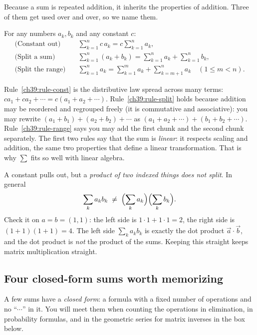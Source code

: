 Because a sum is repeated addition, it inherits the properties of addition. Three of
them get used over and over, so we name them.

\begin{formalbox}
For any numbers $a_k, b_k$ and any constant $c$:
\begin{align}
\text{(Constant out)}\quad & \sum_{k=1}^{n} c\,a_k = c\sum_{k=1}^{n} a_k, \label{ch39:rule-const}\\[2pt]
\text{(Split a sum)}\quad & \sum_{k=1}^{n} (a_k + b_k) = \sum_{k=1}^{n} a_k + \sum_{k=1}^{n} b_k, \label{ch39:rule-split}\\[2pt]
\text{(Split the range)}\quad & \sum_{k=1}^{n} a_k = \sum_{k=1}^{m} a_k + \sum_{k=m+1}^{n} a_k \quad (1 \le m < n). \label{ch39:rule-range}
\end{align}
\end{formalbox}

Rule~\eqref{ch39:rule-const} is the distributive law spread across many terms:
$ca_1 + ca_2 + \cdots = c(a_1 + a_2 + \cdots)$. Rule~\eqref{ch39:rule-split} holds because addition
may be reordered and regrouped freely (it is commutative and associative): you may rewrite
$(a_1+b_1) + (a_2+b_2) + \cdots$ as $(a_1 + a_2 + \cdots) + (b_1 + b_2 + \cdots)$.
Rule~\eqref{ch39:rule-range} says you may add the first chunk and the second chunk separately. The
first two rules say that the sum is \emph{linear}: it respects scaling and addition, the same two
properties that define a linear transformation. That is why $\sum$ fits so well with linear algebra.

\begin{trapbox}
A constant pulls out, but a \emph{product of two indexed things does not split}. In general
\[
\sum_k a_k b_k \;\ne\; \Bigl(\sum_k a_k\Bigr)\Bigl(\sum_k b_k\Bigr).
\]
Check it on $a = b = (1,1)$: the left side is $1\cdot1 + 1\cdot1 = 2$, the right side is
$(1+1)(1+1) = 4$. The left side $\sum_k a_k b_k$ is exactly the dot product $\vec{a}\cdot\vec{b}$,
and the dot product is \emph{not} the product of the sums. Keeping this straight keeps matrix
multiplication straight.
\end{trapbox}

\subsection{Four closed-form sums worth memorizing}
\label{ch39:closed-forms}

A few sums have a \emph{closed form}: a formula with a fixed number of operations and no ``$\cdots$''
in it. You will meet them when counting the operations in elimination, in probability formulas, and in
the geometric series for matrix inverses in the box below.


